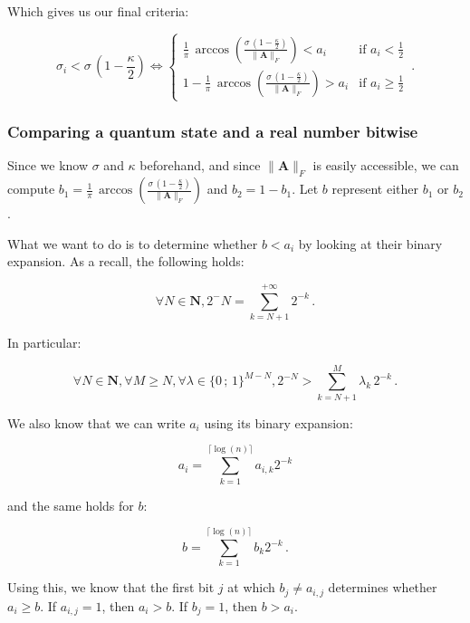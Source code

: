 \documentclass[11pt, a4paper]{article}
\begin{document}
                Which gives us our final criteria:
                
                \[\sigma_i < \sigma\,\left(1 - \frac\kappa2\right)\iff\begin{cases}\frac1\pi\,\arccos\left(\frac{\sigma\,\left(1 - \frac\kappa2\right)}{\|\mathbf{A}\|_F}\right) < a_i&\text{if }a_i<\frac12\\1-\frac1\pi\,\arccos\left(\frac{\sigma\,\left(1 - \frac\kappa2\right)}{\|\mathbf{A}\|_F}\right) > a_i&\text{if }a_i\geqslant\frac12\end{cases}\,.\]
            
            \subsubsection{Comparing a quantum state and a real number bitwise}
                Since we know \(\sigma\) and \(\kappa\) beforehand, and since \(\|\mathbf{A}\|_F\) is easily accessible, we can compute \(b_1=\frac1\pi\,\arccos\left(\frac{\sigma\,\left(1 - \frac\kappa2\right)}{\|\mathbf{A}\|_F}\right)\) and \(b_2 = 1 - b_1\). Let \(b\) represent either \(b_1\) or \(b_2\).
                
                What we want to do is to determine whether \(b<a_i\) by looking at their binary expansion. As a recall, the following holds:
                
                \[\forall N\in\mathbf{N},2^-N=\sum_{k=N+1}^{+\infty}2^{-k}\,.\]
                
                In particular:
                
                \[\forall N\in\mathbf{N},\forall M\geqslant N,\forall \lambda\in\{0\,;\,1\}^{M-N},2^{-N}>\sum_{k=N+1}^M\lambda_k\,2^{-k}\,.\]
                
                We also know that we can write \(a_i\) using its binary expansion:
                
                \[a_i=\sum_{k=1}^{\lceil\log(n)\rceil}a_{i,k}2^{-k}\]
                
                and the same holds for \(b\):
                
                \[b=\sum_{k=1}^{\lceil\log(n)\rceil}b_{k}2^{-k}\,.\]
                
                Using this, we know that the first bit \(j\) at which \(b_j\neq a_{i,j}\) determines whether \(a_i\geqslant b\). If \(a_{i,j}=1\), then \(a_i>b\). If \(b_j=1\), then \(b>a_i\).
                
\end{document}
